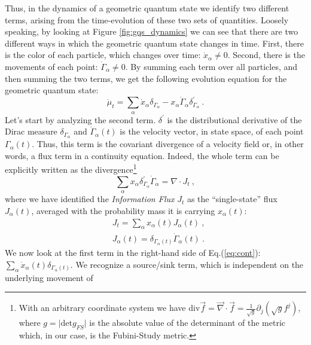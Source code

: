 \documentclass[%
 reprint,
 superscriptaddress,
 aps,
 pra,
]{revtex4-2}
\theoremstyle{definition}
\begin{document}
Thus, in the dynamics of a geometric quantum state we identify two different terms, arising from the 
time-evolution of these two sets of quantities. Loosely speaking, by looking at Figure \ref{fig:gqs_dynamics}
we can see that there are two different ways in which the geometric quantum state changes 
in time. First, there is the color of each particle, which changes over time: $\dot{x}_\alpha \neq 0$. Second, there is
the movements of each point: $\dot{\Gamma}_\alpha \neq 0$. By summing each term over
all particles, and then summing the two terms, we get the following evolution equation for the geometric quantum state:
\begin{equation}
\dot{\mu}_t = \sum_\alpha \dot{x}_\alpha \delta_{\Gamma_\alpha} - x_\alpha \dot{\Gamma}_{\alpha} \delta^{'}_{\Gamma_\alpha} ~.\label{eq:cont}
\end{equation}
Let's start by analyzing the second term. $\delta^{'}$ is the distributional derivative 
of the Dirac measure $\delta_{\Gamma_\alpha}$ and $\dot{\Gamma}_\alpha(t)$ is 
the velocity vector, in state space, of each point $\Gamma_\alpha(t)$. Thus, this term 
is the covariant divergence of a velocity field or, in other words, a flux term in a continuity equation. 
Indeed, the whole term can be explicitly written as the divergence\footnote{With an arbitrary coordinate system we have 
$\mathrm{div} \vec{f} =  \vec{\nabla} \cdot \vec{f} = \frac{1}{\sqrt{g}} \partial_j \left(\sqrt{g} f^j\right)$,
where $g = \vert \mathrm{det} g_{FS}\vert$ is the absolute value of the determinant of the metric which, 
in our case, is the Fubini-Study metric.}
\begin{equation}
\sum_\alpha x_\alpha \delta^{'}_{\Gamma_\alpha} \dot{\Gamma}_{\alpha} = \nabla \cdot J_t~,
\end{equation}
where we have identified the \emph{Information Flux} $J_t$ as the ``single-state'' flux $J_\alpha(t)$, averaged
with the probability mass it is carrying $x_\alpha(t)$:
\begin{subequations}\label{eq:flux}
\begin{align}
&J_t = \sum_\alpha x_\alpha(t)J_\alpha(t)~,\\
&J_\alpha(t) =  \delta_{\Gamma_\alpha(t)} \dot{\Gamma}_{\alpha}(t)~.
\end{align}
\end{subequations}
We now look at the first term in the right-hand side of Eq.(\ref{eq:cont}): $\sum_\alpha \dot{x}_\alpha(t) \delta_{\Gamma_\alpha(t)}$.
We recognize a source/sink term, which is independent on the underlying movement of
\end{document}
